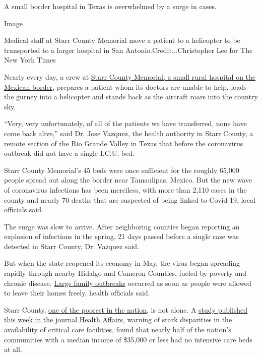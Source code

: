 A small border hospital in Texas is overwhelmed by a surge in cases.

Image

Medical staff at Starr County Memorial move a patient to a helicopter to
be transported to a larger hospital in San Antonio.Credit...Christopher
Lee for The New York Times

Nearly every day, a crew at
\href{https://www.nytimes3xbfgragh.onion/2020/08/04/us/texas-coronavirus-rio-grande-valley-starr-county.html}{Starr
County Memorial, a small rural hospital on the Mexican border}, prepares
a patient whom its doctors are unable to help, loads the gurney into a
helicopter and stands back as the aircraft roars into the country sky.

``Very, very unfortunately, of all of the patients we have transferred,
none have come back alive,'' said Dr. Jose Vazquez, the health authority
in Starr County, a remote section of the Rio Grande Valley in Texas that
before the coronavirus outbreak did not have a single I.C.U. bed.

Starr County Memorial's 45 beds were once sufficient for the roughly
65,000 people spread out along the border near Tamaulipas, Mexico. But
the new wave of coronavirus infections has been merciless, with more
than 2,110 cases in the county and nearly 70 deaths that are suspected
of being linked to Covid-19, local officials said.

The surge was slow to arrive. After neighboring counties began reporting
an explosion of infections in the spring, 21 days passed before a single
case was detected in Starr County, Dr. Vazquez said.

But when the state reopened its economy in May, the virus began
spreading rapidly through nearby Hidalgo and Cameron Counties, fueled by
poverty and chronic disease.
\href{https://www.nytimes3xbfgragh.onion/2020/07/14/us/coronavirus-texas-rio-grande-valley-border.html}{Large
family outbreaks} occurred as soon as people were allowed to leave their
homes freely, health officials said.

Starr County,
\href{https://www.usatoday.com/story/money/2019/01/25/poorest-counties-in-the-us-median-household-income/38870175/}{one
of the poorest in the nation}, is not alone. A
\href{https://www.healthaffairs.org/doi/10.1377/hlthaff.2020.00581}{study
published this week in the journal Health Affairs}, warning of stark
disparities in the availability of critical care facilities, found that
nearly half of the nation's communities with a median income of \$35,000
or less had no intensive care beds at all.

